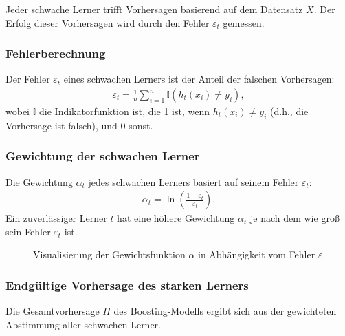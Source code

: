 Jeder schwache Lerner trifft Vorhersagen basierend auf dem Datensatz \( X \). Der Erfolg dieser Vorhersagen wird durch den Fehler \( \varepsilon_t \) gemessen.

\subsubsection{Fehlerberechnung}\label{sec:errorComputation}
Der Fehler \( \varepsilon_t \) eines schwachen Lerners ist der Anteil der falschen Vorhersagen:
\begin{gather}
    \varepsilon_t = \frac{1}{n} \sum_{i=1}^{n} \mathbb{I}(h_t(x_i) \neq y_i),
\end{gather}
wobei \( \mathbb{I} \) die Indikatorfunktion ist, die 1 ist, wenn \( h_t(x_i) \neq y_i \) (d.h., die Vorhersage ist falsch), und 0 sonst.

\subsubsection{Gewichtung der schwachen Lerner}\label{sec:weightedLearners}
Die Gewichtung \( \alpha_t \) jedes schwachen Lerners basiert auf seinem Fehler \( \varepsilon_t \):
\begin{gather}
    \alpha_t = \ln\left(\frac{1 - \varepsilon_t}{\varepsilon_t}\right).
\end{gather}
Ein zuverlässiger Lerner \( t \) hat eine höhere Gewichtung \( \alpha_t \) je nach dem wie groß sein Fehler \( \varepsilon_t \) ist.

\begin{figure}[h]
    \centering
    \caption{Visualisierung der Gewichtsfunktion \( \alpha \) in Abhängigkeit vom Fehler \( \varepsilon \)}
    \label{fig:alpha_plot}
\end{figure}
    

\subsubsection{Endgültige Vorhersage des starken Lerners}
Die Gesamtvorhersage \( H \) des Boosting-Modells ergibt sich aus der gewichteten Abstimmung aller schwachen Lerner.

